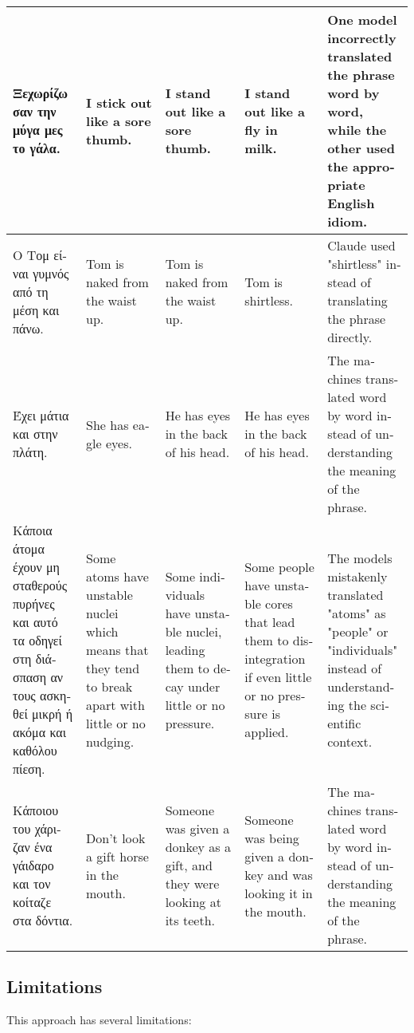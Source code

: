 \documentclass[twocolumn]{article}
\newcommand{\en}[1]{\foreignlanguage{english}{#1}}
\newcommand{\gr}[1]{\foreignlanguage{greek}{#1}}
\begin{document}
\begin{table}[h!]
{\begin{tabular}{|p{3.2cm}|p{3.2cm}|p{3.2cm}|p{3.2cm}|p{4cm}|}
\gr{Ξεχωρίζω σαν την μύγα μες το γάλα.} & \en{I stick out like a sore thumb.} & \en{I stand out like a sore thumb.} & \en{I stand out like a fly in milk.} & \en{One model incorrectly translated the phrase word by word, while the other used the appropriate English idiom.} \\ \hline

\gr{Ο Τομ είναι γυμνός από τη μέση και πάνω.} & \en{Tom is naked from the waist up.} & \en{Tom is naked from the waist up.} & \en{Tom is shirtless.} & \en{Claude used "shirtless" instead of translating the phrase directly.} \\ \hline

\gr{Έχει μάτια και στην πλάτη.} & \en{She has eagle eyes.} & \en{He has eyes in the back of his head.} & \en{He has eyes in the back of his head.} & \en{The machines translated word by word instead of understanding the meaning of the phrase.} \\ \hline

\gr{Κάποια άτομα έχουν μη σταθερούς πυρήνες και αυτό τα οδηγεί στη διάσπαση αν τους ασκηθεί μικρή ή ακόμα και καθόλου πίεση.} & \en{Some atoms have unstable nuclei which means that they tend to break apart with little or no nudging.} & \en{Some individuals have unstable nuclei, leading them to decay under little or no pressure.} & \en{Some people have unstable cores that lead them to disintegration if even little or no pressure is applied.} & \en{The models mistakenly translated "atoms" as "people" or "individuals" instead of understanding the scientific context.} \\ \hline

\gr{Κάποιου του χάριζαν ένα γάιδαρο και τον κοίταζε στα δόντια.} & \en{Don’t look a gift horse in the mouth.} & \en{Someone was given a donkey as a gift, and they were looking at its teeth.} & \en{Someone was being given a donkey and was looking it in the mouth.} & \en{The machines translated word by word instead of understanding the meaning of the phrase.} \\ \hline

\end{tabular}
}
\end{table}

\subsection{\en{Limitations}}
\en{This approach has several limitations:}
\end{document}
